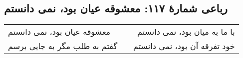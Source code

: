 \begin{center}
\section*{رباعی شمارهٔ ۱۱۷: معشوقه عیان بود، نمی دانستم}
\label{sec:117}
\begin{longtable}{l p{0.5cm} r}
معشوقه عیان بود، نمی دانستم
&&
با ما به میان بود، نمی دانستم
\\
گفتم به طلب مگر به جایی برسم
&&
خود تفرقه آن بود، نمی دانستم
\\
\end{longtable}
\end{center}
